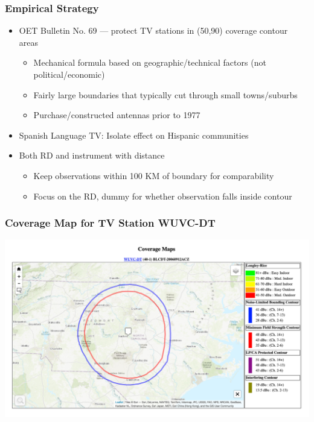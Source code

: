\documentclass{beamer}
\begin{document}
\begin{frame}
\frametitle{Empirical Strategy}
\begin{itemize}

\item OET Bulletin No. 69 --- protect TV stations in (50,90) coverage contour areas
\begin{itemize}
\item Mechanical formula based on geographic/technical factors (not political/economic)
\item Fairly large boundaries that typically cut through small towns/suburbs
\item Purchase/constructed antennas prior to 1977
\end{itemize}
\item Spanish Language TV: Isolate effect on Hispanic communities
\item Both RD and instrument with distance
\begin{itemize}
\item Keep observations within 100 KM of boundary for comparability
\item Focus on the RD, dummy for whether observation falls inside contour
\end{itemize}

\end{itemize}

\end{frame}

\begin{frame}
\frametitle{Coverage Map for TV Station WUVC-DT}
\centering
        \includegraphics[width=1\textwidth]{../../analysis/Output/img/ContourExample.png}\\
\end{frame}
\end{document}
